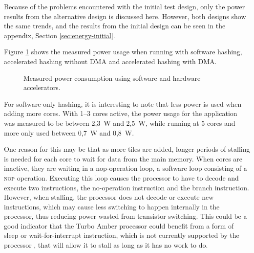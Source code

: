 Because of the problems encountered with the initial test design, only the power results from the alternative design
is discussed here. However, both designs show the same trends, and the results from the initial design can be seen in
the appendix, Section \ref{sec:energy-initial}.

Figure \ref{fig:power-plot} shows the measured power usage when running with software hashing, accelerated hashing without DMA
and accelerated hashing with DMA.

\begin{figure}
	\centering
	\caption{Measured power consumption using software and hardware accelerators.}
	\label{fig:power-plot}
\end{figure}

For software-only hashing, it is interesting to note that less power is used when adding more cores. With 1--3 cores
active, the power usage for the application was measured to be between 2,3~W and 2,5~W, while running at 5 cores and
more only used between 0,7~W and 0,8~W.

One reason for this may be that as more tiles are added, longer periods of stalling is needed for each core to wait for data from
the main memory. When cores are inactive, they are waiting in a nop-operation loop, a software loop consisting of a
\textsc{nop} operation. Executing this loop causes the processor to have to decode and execute two instructions,
the no-operation instruction and the branch instruction. However, when stalling, the processor does not decode or
execute new instructions, which may cause less switching to happen internally in the processor, thus reducing power
wasted from transistor switching. This could be a good indicator that the Turbo Amber processor could benefit
from a form of sleep or wait-for-interrupt instruction, which is not currently supported by the processor \cite{amber-spec}, that will
allow it to stall as long as it has no work to do.

